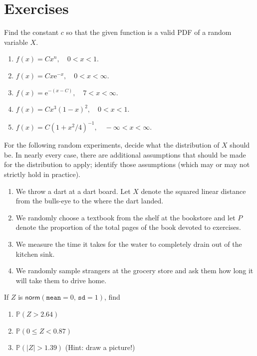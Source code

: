 \documentclass[captions=tableheading]{scrbook}
\begin{document}
\begin{example}
\end{example}

\newpage{}
\section{Exercises}
\label{sec-6-6}

\setcounter{thm}{0}

\begin{xca}
Find the constant \(c\) so that the given function is a valid PDF of a random variable \(X\).
\begin{enumerate}
\item \( f(x) = Cx^{n},\quad 0 < x <1 \).
\item \( f(x) = Cx\mathrm{e}^{-x},\quad 0 < x < \infty\).
\item \( f(x) = \mathrm{e}^{-(x - C)}, \quad 7 < x < \infty.\)
\item \( f(x) = Cx^{3}(1 - x)^{2},\quad 0 < x < 1.\)
\item \( f(x) = C(1 + x^{2}/4)^{-1}, \quad -\infty < x < \infty.\)
\end{enumerate}

\end{xca}

\begin{xca}
For the following random experiments, decide what the distribution of \(X\) should be. In nearly every case, there are additional assumptions that should be made for the distribution to apply; identify those assumptions (which may or may not strictly hold in practice).
\begin{enumerate}
\item We throw a dart at a dart board. Let \(X\) denote the squared linear distance from the bulls-eye to the where the dart landed.
\item We randomly choose a textbook from the shelf at the bookstore and let \(P\) denote the proportion of the total pages of the book devoted to exercises.
\item We measure the time it takes for the water to completely drain out of the kitchen sink.
\item We randomly sample strangers at the grocery store and ask them how long it will take them to drive home.
\end{enumerate}

\end{xca}

\begin{xca}
If \(Z\) is \(\mathsf{norm}(\mathtt{mean}=0,\,\mathtt{sd}=1)\), find 
\begin{enumerate}
\item \(\mathbb{P}(Z>2.64)\)
\item \(\mathbb{P}(0\leq Z<0.87)\)
\item \(\mathbb{P}(|Z|>1.39)\) (Hint: draw a picture!)
\end{enumerate}

\end{xca}
\end{document}
